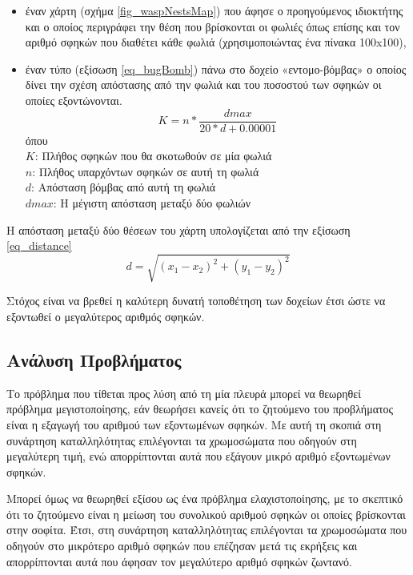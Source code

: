 \begin{itemize}
  \item  έναν χάρτη (σχήμα \ref{fig_waspNestsMap}) που άφησε ο προηγούμενος ιδιοκτήτης και ο οποίος περιγράφει την θέση που βρίσκονται οι φωλιές όπως επίσης και τον αριθμό σφηκών που διαθέτει κάθε φωλιά (χρησιμοποιώντας ένα πίνακα 100x100),
  \item έναν τύπο (εξίσωση \ref{eq_bugBomb}) πάνω στο δοχείο «εντομο-βόμβας» ο οποίος δίνει την σχέση απόστασης από την φωλιά και του ποσοστού των σφηκών οι οποίες εξοντώνονται.
      \begin{equation}\label{eq_bugBomb}
        K = n* \frac{dmax}{20*d+0.00001}
      \end{equation}
      όπου\\
      $K$: Πλήθος σφηκών που θα σκοτωθούν σε μία φωλιά\\
      $n$: Πλήθος υπαρχόντων σφηκών σε αυτή τη φωλιά\\
      $d$: Απόσταση βόμβας από αυτή τη φωλιά\\
     $dmax$: Η μέγιστη απόσταση μεταξύ δύο φωλιών\\
\end{itemize}

Η απόσταση μεταξύ δύο θέσεων του χάρτη υπολογίζεται από την εξίσωση \ref{eq_distance} 
\begin{equation}\label{eq_distance}
    d = \sqrt{(x_{1}-x_{2})^2+(y_{1}-y_{2})^2}
\end{equation}

Στόχος είναι να βρεθεί η καλύτερη δυνατή τοποθέτηση των δοχείων έτσι ώστε να εξοντωθεί ο μεγαλύτερος αριθμός σφηκών.

\subsection{Ανάλυση Προβλήματος}

Το πρόβλημα που τίθεται προς λύση από τη μία πλευρά μπορεί να θεωρηθεί πρόβλημα μεγιστοποίησης, εάν θεωρήσει κανείς ότι το ζητούμενο του προβλήματος είναι η εξαγωγή του αριθμού των εξοντωμένων σφηκών. Με αυτή τη σκοπιά στη συνάρτηση καταλληλότητας επιλέγονται τα χρωμοσώματα που οδηγούν στη μεγαλύτερη τιμή, ενώ απορρίπτονται αυτά που εξάγουν μικρό αριθμό εξοντωμένων σφηκών.

Μπορεί όμως να θεωρηθεί εξίσου ως ένα πρόβλημα ελαχιστοποίησης, με το σκεπτικό ότι το ζητούμενο είναι η μείωση του συνολικού αριθμού σφηκών οι οποίες βρίσκονται στην σοφίτα. Έτσι, στη συνάρτηση καταλληλότητας επιλέγονται τα χρωμοσώματα που οδηγούν στο μικρότερο αριθμό σφηκών που επέζησαν μετά τις εκρήξεις και απορρίπτονται αυτά που άφησαν τον μεγαλύτερο αριθμό σφηκών ζωντανό.

